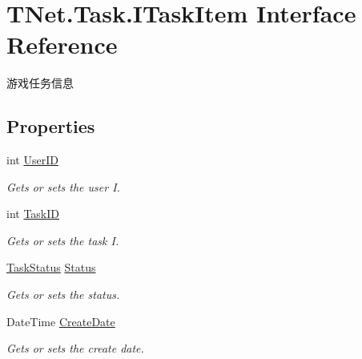 \hypertarget{interface_t_net_1_1_task_1_1_i_task_item}{}\section{T\+Net.\+Task.\+I\+Task\+Item Interface Reference}
\label{interface_t_net_1_1_task_1_1_i_task_item}


游戏任务信息  


\subsection*{Properties}
\begin{DoxyCompactItemize}
\item 
int \mbox{\hyperlink{interface_t_net_1_1_task_1_1_i_task_item_a93aff6c4a183a16b2e48eed8a883169d}{User\+ID}}
\begin{DoxyCompactList}\small\item\em Gets or sets the user I. \end{DoxyCompactList}\item 
int \mbox{\hyperlink{interface_t_net_1_1_task_1_1_i_task_item_a535d166a4d3bf7d53a7e11260c8dc8fd}{Task\+ID}}
\begin{DoxyCompactList}\small\item\em Gets or sets the task I. \end{DoxyCompactList}\item 
\mbox{\hyperlink{namespace_t_net_1_1_task_a130950819ba1d2807bfb809104d1a462}{Task\+Status}} \mbox{\hyperlink{interface_t_net_1_1_task_1_1_i_task_item_a1c9ab601ddd28f02a695f73b3717a2cd}{Status}}
\begin{DoxyCompactList}\small\item\em Gets or sets the status. \end{DoxyCompactList}\item 
Date\+Time \mbox{\hyperlink{interface_t_net_1_1_task_1_1_i_task_item_a07d0c62a1f5e5622594bd4efaf1001a9}{Create\+Date}}
\begin{DoxyCompactList}\small\item\em Gets or sets the create date. \end{DoxyCompactList}\end{DoxyCompactItemize}


